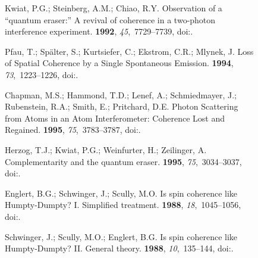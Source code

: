 \documentclass[entropy,article,accept,oneauthor,pdftex]{Definitions/mdpi}
\begin{document}
\begin{figure}[H]
\begin{thebibliography}{999}
Kwiat, P.G.; Steinberg, A.M.; Chiao, R.Y.
\newblock Observation of a ``quantum eraser:'' A revival of coherence in a
  two-photon interference experiment.
 {\bf 1992}, {\em 45},~7729--7739, doi:{\href{https://doi.org/10.1103/PhysRevA.45.7729}{}}.

Pfau, T.; Sp\"alter, S.; Kurtsiefer, C.; Ekstrom, C.R.; Mlynek, J.
\newblock Loss of Spatial Coherence by a Single Spontaneous Emission.
 {\bf 1994}, {\em 73},~1223--1226, doi:{\href{https://doi.org/10.1103/PhysRevLett.73.1223}{}}.

Chapman, M.S.; Hammond, T.D.; Lenef, A.; Schmiedmayer, J.; Rubenstein, R.A.;
  Smith, E.; Pritchard, D.E.
\newblock Photon Scattering from Atoms in an Atom Interferometer: Coherence
  Lost and Regained.
 {\bf 1995}, {\em 75},~3783--3787, doi:{\href{https://doi.org/10.1103/PhysRevLett.75.3783}{}}.

Herzog, T.J.; Kwiat, P.G.; Weinfurter, H.; Zeilinger, A.
\newblock Complementarity and the quantum eraser.
 {\bf 1995}, {\em 75},~3034--3037, doi:{\href{https://doi.org/10.1103/PhysRevLett.75.3034}{}}.

Englert, B.G.; Schwinger, J.; Scully, M.O.
\newblock Is spin coherence like {H}umpty-{D}umpty? {I}. {S}implified
  treatment.
 {\bf 1988}, {\em 18},~1045--1056, doi:{\href{https://doi.org/10.1007/BF01909939}{}}.

Schwinger, J.; Scully, M.O.; Englert, B.G.
\newblock Is spin coherence like {H}umpty-{D}umpty? {II}. {G}eneral theory.
  {\bf 1988}, {\em 10},~135--144, doi:{\href{https://doi.org/10.1007/BF01384847}{}}.


\end{thebibliography}
\end{figure}
\end{document}

